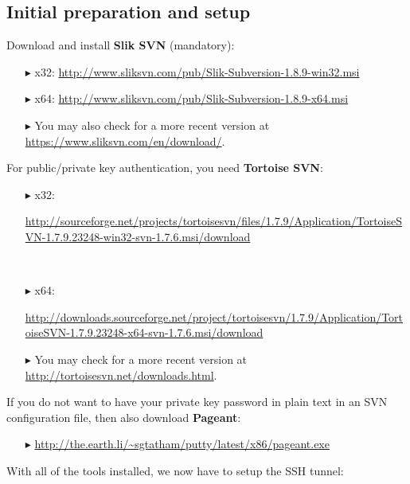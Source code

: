 \subsection{Initial preparation and setup}

Download and install \textbf{Slik SVN} (mandatory):
\begin{enumerate}
  \item[$\blacktriangleright$] x32: \small{\url{http://www.sliksvn.com/pub/Slik-Subversion-1.8.9-win32.msi}}
  \item[$\blacktriangleright$] x64: {\small
   \url{http://www.sliksvn.com/pub/Slik-Subversion-1.8.9-x64.msi}}
  \item[$\blacktriangleright$] You may also check for a more recent version at
  \small{\url{https://www.sliksvn.com/en/download/}}.
\end{enumerate}

For public/private key authentication, you need \textbf{Tortoise SVN}:

\begin{enumerate}
  \item[$\blacktriangleright$] x32: {\small \begin{minipage}{.95\textwidth} 
  \url{http://sourceforge.net/projects/tortoisesvn/files/1.7.9/Application/TortoiseSVN-1.7.9.23248-win32-svn-1.7.6.msi/download}
    \end{minipage}}\\
  \item[$\blacktriangleright$] x64: {\small\begin{minipage}{.9\textwidth} 
  \url{http://downloads.sourceforge.net/project/tortoisesvn/1.7.9/Application/TortoiseSVN-1.7.9.23248-x64-svn-1.7.6.msi/download}\end{minipage}}
  \item[$\blacktriangleright$] You may check for a more recent version at
  \small{\url{http://tortoisesvn.net/downloads.html}}.
\end{enumerate}

If you do not want to have your private key password in plain text in an SVN configuration file, then also download \textbf{Pageant}:
\begin{enumerate}
  \item[$\blacktriangleright$] {\small \url{http://the.earth.li/~sgtatham/putty/latest/x86/pageant.exe}}
\end{enumerate}

With all of the tools installed, we now have to setup the SSH tunnel:

